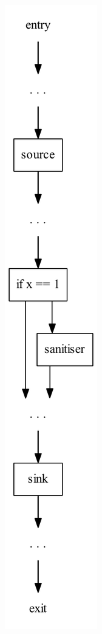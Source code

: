 \begin{frame}[plain]
\begin{figure}
\begin{subfigure}[b]{0.45\textwidth}
  \end{subfigure}
  ~
  \begin{subfigure}[b]{0.45\textwidth}
    \centering
    \includegraphics[scale=0.35]{graphics/sanitised_with_flow.pdf}
  \end{subfigure}
\end{figure}
\end{frame}


